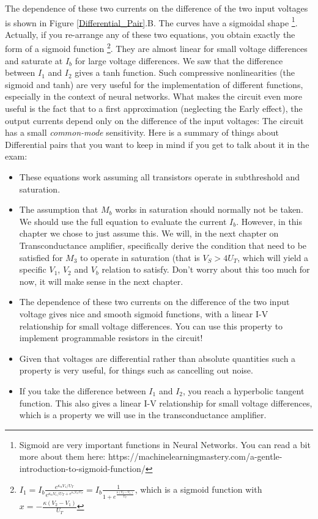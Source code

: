 The dependence of these two currents on the difference of the two input voltages is shown in Figure \ref{Differential_Pair}.B. The curves have a sigmoidal shape \footnote{Sigmoid are very important functions in Neural Networks. You can read a bit more about them here: https://machinelearningmastery.com/a-gentle-introduction-to-sigmoid-function/}. Actually, if you re-arrange any of these two equations, you obtain exactly the form of a sigmoid function \footnote{$I_1 = I_b\frac{e^{\kappa_n V_1/U_T}}{e^{\kappa_n V_1/U_T + e^{\kappa_n V_2/U_T}}} = I_b\frac{1}{1+ e^{\frac{\kappa (V_2-V_1)}{U_T}}}$, which is a sigmoid function with $x = -\frac{\kappa (V_2-V_1)}{U_T}$}. They are almost linear for small voltage differences and saturate at $I_b$ for large voltage differences. We saw that the difference between $I_1$ and $I_2$ gives a tanh function. Such compressive nonlinearities (the sigmoid and tanh) are very useful for the implementation  of different functions, especially in the context of neural networks. What makes the circuit even more useful is the fact that to a first approximation (neglecting the Early effect), the output currents depend only on the difference of the input voltages: The circuit has a small \textit{common-mode} sensitivity. Here is a summary of things about Differential pairs that you want to keep in mind if you get to talk about it in the exam: 
\begin{itemize}
    \item These equations work assuming all transistors operate in subthreshold and saturation.
    \item The assumption that $M_b$ works in saturation should normally not be taken. We should use the full equation to evaluate the current $I_b$. However, in this chapter we chose to just assume this. We will, in the next chapter on Transconductance amplifier, specifically derive the condition that need to be satisfied for $M_3$ to operate in saturation (that is $V_S > 4U_T$, which will yield a specific $V_1$, $V_2$ and $V_b$ relation to satisfy. Don't worry about this too much for now, it will make sense in the next chapter. 
    \item The dependence of these two currents on the difference of the two input voltage gives nice and smooth sigmoid functions, with a linear I-V relationship for small voltage differences. You can use this property to implement programmable resistors in the circuit!
    \item Given that voltages are differential rather than absolute quantities such a property is very useful, for things such as cancelling out noise.
    \item If you take the difference between $I_1$ and $I_2$, you reach a hyperbolic tangent function. This also gives a linear I-V relationship for small voltage differences, which is a property we will use in the transconductance amplifier. 
\end{itemize}

